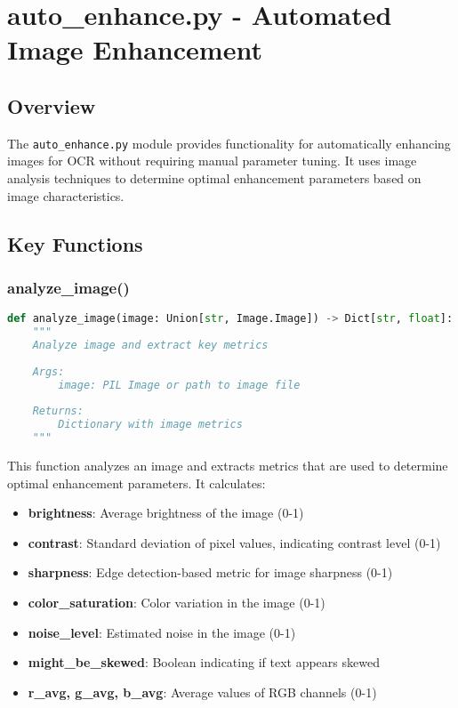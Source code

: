 \section{auto\_enhance.py - Automated Image Enhancement}

\subsection{Overview}
The \texttt{auto\_enhance.py} module provides functionality for automatically enhancing images for OCR without requiring manual parameter tuning. It uses image analysis techniques to determine optimal enhancement parameters based on image characteristics.

\subsection{Key Functions}

\subsubsection{analyze\_image()}
\begin{lstlisting}[language=Python, caption=Image Analysis Function]
def analyze_image(image: Union[str, Image.Image]) -> Dict[str, float]:
    """
    Analyze image and extract key metrics
    
    Args:
        image: PIL Image or path to image file
        
    Returns:
        Dictionary with image metrics
    """
\end{lstlisting}

This function analyzes an image and extracts metrics that are used to determine optimal enhancement parameters. It calculates:

\begin{itemize}
    \item \textbf{brightness}: Average brightness of the image (0-1)
    \item \textbf{contrast}: Standard deviation of pixel values, indicating contrast level (0-1)
    \item \textbf{sharpness}: Edge detection-based metric for image sharpness (0-1)
    \item \textbf{color\_saturation}: Color variation in the image (0-1)
    \item \textbf{noise\_level}: Estimated noise in the image (0-1)
    \item \textbf{might\_be\_skewed}: Boolean indicating if text appears skewed
    \item \textbf{r\_avg, g\_avg, b\_avg}: Average values of RGB channels (0-1)
\end{itemize}

